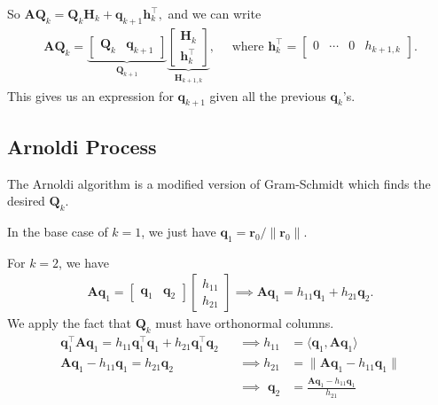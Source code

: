 \documentclass[12pt,a4paper]{article} %
\begin{document}
So $\mathbf{A} \mathbf{Q}_{k}=\mathbf{Q}_{k} \mathbf{H}_{k}+\bm{q}_{k+1} \bm{h}_{k}^{\top},$ and we can write
\begin{align*}
    \mathbf{A} \mathbf{Q}_{k}=
    \underbrace{\begin{bmatrix}
        \mathbf Q_k & \bm q_{k+1}
    \end{bmatrix}}_{\mathbf Q_{k+1}}
    \underbrace{\begin{bmatrix}\mathbf{H}_{k} \\[0.8em] \bm{h}_{k}^{\top}\end{bmatrix}}_{\mathbf H_{k+1,k}}, 
        \quad \text { where }\bm{h}_{k}^\top= \begin{bmatrix}
            0 & \cdots & 0 & h_{k+1,k}
        \end{bmatrix}.
\end{align*}
This gives us an expression for $\bm q_{k+1}$ given all the previous $\bm q_k$'s.

\subsection{Arnoldi Process}
The Arnoldi algorithm is a modified version of Gram-Schmidt which finds 
the desired $\mathbf Q_k$.

In the base case of $k=1$, 
we just have $\bm q_1 = \bm r_0 / \| \bm r_0 \|$.

For $k=2$, we have 
\begin{align*}
    \mathbf{A} \bm q_1=
    \begin{bmatrix}
        \bm q_1 & \bm q_2
    \end{bmatrix}
    \begin{bmatrix}
        h_{11} \\ h_{21}
    \end{bmatrix} \implies 
    \mathbf A \bm q_1 = h_{11} \bm q_1 + h_{21} \bm q_2.
\end{align*}
We apply the fact that $\mathbf Q_k$ must have orthonormal columns. 
\begin{align*}
    \bm q_1^\top\mathbf A \bm q_1 = h_{11} \bm q_1^\top\bm q_1 + h_{21} \bm q_1^\top\bm q_2&& \implies h_{11} &= \langle \bm q_1, \mathbf A \bm q_1\rangle \\ 
    \mathbf A \bm q_1 - h_{11} \bm q_1 = h_{21} \bm q_2&& \implies h_{21} &= \| \mathbf A \bm q_1 - h_{11} \bm q_1\| \\ 
    &&\implies \,\,\bm q_2 &= \frac{\mathbf A \bm q_1 - h_{11} \bm q_1}{h_{21}}
\end{align*}
\end{document}
